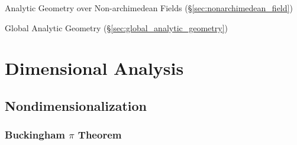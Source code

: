 Analytic Geometry over Non-archimedean Fields (\S\ref{sec:nonarchimedean_field})

\fist Global Analytic Geometry (\S\ref{sec:global_analytic_geometry})



\section{Dimensional Analysis}\label{sec:dimensional_analysis}


\subsection{Nondimensionalization}\label{sec:nondimensionalization}

\subsubsection{Buckingham $\pi$ Theorem}\label{sec:buckingham_pi}
